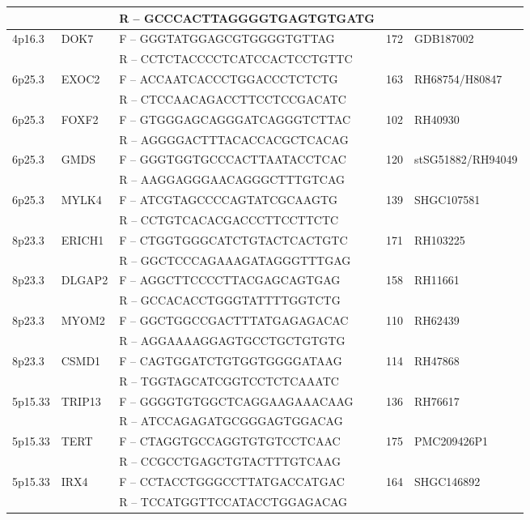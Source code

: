 \begin{longtabu}{ l l l l l}
  &  & R – GCCCACTTAGGGGTGAGTGTGATG &  &  \\* \midrule
 4p16.3 & DOK7 & F – GGGTATGGAGCGTGGGGTGTTAG & 172 & GDB187002 \\* \midrule
  &  & R – CCTCTACCCCTCATCCACTCCTGTTC &  &  \\* \midrule
 6p25.3 & EXOC2 & F – ACCAATCACCCTGGACCCTCTCTG & 163 & RH68754/H80847 \\* \midrule
  &  & R – CTCCAACAGACCTTCCTCCGACATC &  &  \\* \midrule
 6p25.3 & FOXF2 & F – GTGGGAGCAGGGATCAGGGTCTTAC & 102 & RH40930 \\* \midrule
  &  & R – AGGGGACTTTACACCACGCTCACAG &  &  \\* \midrule
 6p25.3 & GMDS & F – GGGTGGTGCCCACTTAATACCTCAC & 120 & stSG51882/RH94049 \\* \midrule
  &  & R – AAGGAGGGAACAGGGCTTTGTCAG &  &  \\* \midrule
 6p25.3 & MYLK4 & F – ATCGTAGCCCCAGTATCGCAAGTG & 139 & SHGC107581 \\* \midrule
  &  & R – CCTGTCACACGACCCTTCCTTCTC &  &  \\* \midrule
 8p23.3 & ERICH1 & F – CTGGTGGGCATCTGTACTCACTGTC & 171 & RH103225 \\* \midrule
  &  & R – GGCTCCCAGAAAGATAGGGTTTGAG &  &  \\* \midrule
 8p23.3 & DLGAP2 & F – AGGCTTCCCCTTACGAGCAGTGAG & 158 & RH11661 \\* \midrule
  &  & R – GCCACACCTGGGTATTTTGGTCTG &  &  \\* \midrule
 8p23.3 & MYOM2 & F – GGCTGGCCGACTTTATGAGAGACAC & 110 & RH62439 \\* \midrule
  &  & R – AGGAAAAGGAGTGCCTGCTGTGTG &  &  \\* \midrule
 8p23.3 & CSMD1 & F – CAGTGGATCTGTGGTGGGGATAAG & 114 & RH47868 \\* \midrule
  &  & R – TGGTAGCATCGGTCCTCTCAAATC &  &  \\* \midrule
 5p15.33 & TRIP13 & F – GGGGTGTGGCTCAGGAAGAAACAAG & 136 & RH76617 \\* \midrule
  &  & R – ATCCAGAGATGCGGGAGTGGACAG &  &  \\* \midrule
 5p15.33 & TERT & F – CTAGGTGCCAGGTGTGTCCTCAAC & 175 & PMC209426P1 \\* \midrule
  &  & R – CCGCCTGAGCTGTACTTTGTCAAG &  &  \\* \midrule
 5p15.33 & IRX4 & F – CCTACCTGGGCCTTATGACCATGAC & 164 & SHGC146892 \\* \midrule
  &  & R – TCCATGGTTCCATACCTGGAGACAG &  &  \\* \midrule

\end{longtabu}
